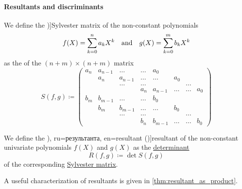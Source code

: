 \paragraph{Resultants and discriminants}

\begin{definition}\label{def:sylvester_matrix}
  We define the \term[ru=матрица Сильвестра, en=Sylvester's matrix (\cite[def. 3.6.2]{CoxLittleOShea2015IdealsVarietiesAlgorithms})]{Sylvester matrix} of the non-constant polynomials
  \begin{align*}
    f(X) = \sum_{k=0}^n a_k X^k
    &&\T{and}&&
    g(X) = \sum_{k=0}^m b_k X^k
  \end{align*}
  as the  of the \( (n + m) \times (n + m) \) matrix
  \begin{equation*}
    S(f, g) \coloneqq
    \begin{pmatrix}
      a_n    & a_{n-1} & \ldots  & \ldots  & a_0     &        &        &        \\
             & a_n     & a_{n-1} & \ldots  & \ldots  & a_0    &        &        \\
             &         & \ldots  & \ldots  &         &        & \ldots &        \\
             &         &         & a_n     & a_{n-1} & \ldots & \ldots & a_0    \\
      b_m    & b_{m-1} & \ldots  & \ldots  & b_0     &        &        &        \\
             & b_m     & b_{m-1} & \ldots  & \ldots  & b_0    &        &        \\
             &         & \ldots  & \ldots  &         &        & \ldots &        \\
             &         &         & b_n     & b_{m-1} & \ldots & \ldots & b_0
    \end{pmatrix}
  \end{equation*}
\end{definition}

\begin{definition}\label{def:resultant}
  We define the \term[bg=резултанта (\cite[198]{Обрешков1962ВисшаАлгебра}), ru=результанта, en=resultant (\cite[def. 3.6.2]{CoxLittleOShea2015IdealsVarietiesAlgorithms})]{resultant} of the non-constant univariate polynomials \( f(X) \) and \( g(X) \) as the \hyperref[def:matrix_determinant]{determinant}
  \begin{equation*}
    R(f, g) \coloneqq \det S(f, g)
  \end{equation*}
  of the corresponding \hyperref[def:sylvester_matrix]{Sylvester matrix}.
\end{definition}
\begin{comments}
  \item A useful characterization of resultants is given in \cref{thm:resultant_as_product}.
\end{comments}

